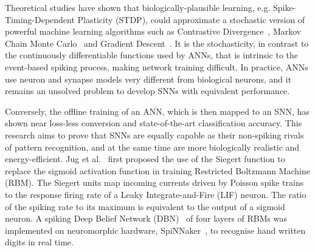 Theoretical studies have shown that biologically-plausible learning, e.g. Spike-Timing-Dependent Plasticity (STDP), could approximate a stochastic version of powerful machine learning algorithms
such as 
Contrastive Divergence~\cite{neftci2013event}, Markov Chain Monte Carlo~\cite{buesing2011neural} and Gradient Descent~\cite{o2016deep}.
It is the stochasticity, in contrast to the continuously differentiable functions used by ANNs, that is intrinsic to the event-based spiking process, making network training difficult.
In practice, ANNs use neuron and synapse models very different from biological neurons, and it remains an unsolved problem to develop SNNs with equivalent performance.


Conversely, the offline training of an ANN, which is then mapped to an SNN, has shown near loss-less conversion and state-of-the-art classification accuracy.
This research aims to prove that SNNs are equally capable as their non-spiking rivals of pattern recognition, and at the same time are more biologically realistic and energy-efficient.
Jug et al.~\cite{Jug_etal_2012} first proposed the use of the Siegert function to replace the sigmoid activation function in training Restricted Boltzmann Machine (RBM).
The Siegert units map incoming currents driven by Poisson spike trains to the response firing rate of a Leaky Integrate-and-Fire (LIF) neuron.
The ratio of the spiking rate to its maximum is equivalent to the output of a sigmoid neuron.
A spiking Deep Belief Network (DBN)~\cite{Stromatias2015scalable} of four layers of RBMs was implemented on neuromorphic hardware, SpiNNaker~\cite{furber2014spinnaker}, to recognise hand written digits in real time.

